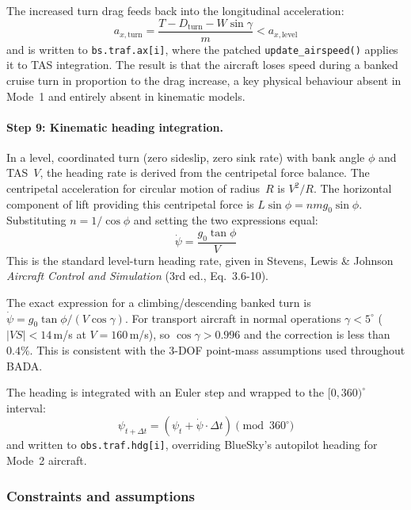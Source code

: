 The increased turn drag feeds back into the longitudinal acceleration:
\begin{equation}
    a_{x,\text{turn}} = \frac{T - D_{\text{turn}} - W \sin \gamma}{m} < a_{x,\text{level}}
\end{equation}
and is written to \texttt{bs.traf.ax[i]}, where the patched \texttt{update\_airspeed()} applies it to TAS integration.  The result is that the aircraft loses speed during a banked cruise turn in proportion to the drag increase, a key physical behaviour absent in Mode~1 and entirely absent in kinematic models.

\paragraph{Step 9: Kinematic heading integration.}
\label{sec:mode2_heading}

In a level, coordinated turn (zero sideslip, zero sink rate) with bank angle $\phi$ and TAS~$V$, the heading rate is derived from the centripetal force balance.  The centripetal acceleration for circular motion of radius~$R$ is $V^2/R$.  The horizontal component of lift providing this centripetal force is $L\sin\phi = n m g_0 \sin\phi$.  Substituting $n = 1/\cos\phi$ and setting the two expressions equal:
\begin{equation}
    \dot{\psi} = \frac{g_0 \tan\phi}{V}
    \label{eq:heading_rate}
\end{equation}
This is the standard level-turn heading rate, given in Stevens, Lewis \& Johnson \emph{Aircraft Control and Simulation} (3rd ed., Eq.~3.6-10).

The exact expression for a climbing/descending banked turn is $\dot{\psi} = g_0 \tan\phi / (V \cos\gamma)$. For transport aircraft in normal operations $\gamma < 5^{\circ}$ ($|VS| < 14$\,m/s at $V = 160$\,m/s), so $\cos\gamma > 0.996$ and the correction is less than $0.4\%$. This is consistent with the 3-DOF point-mass assumptions used throughout BADA.

The heading is integrated with an Euler step and wrapped to the $[0, 360)^{\circ}$ interval:
\begin{equation}
    \psi_{t+\Delta t} = (\psi_t + \dot{\psi} \cdot \Delta t) \pmod{360^{\circ}}
\end{equation}
and written to \texttt{obs.traf.hdg[i]}, overriding BlueSky's autopilot heading for Mode~2 aircraft.

\subsubsection{Constraints and assumptions}
\label{sec:dyn_constraints}

